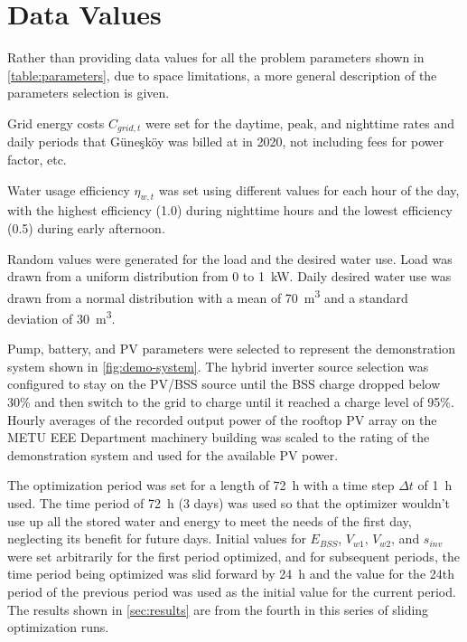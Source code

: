 \section{Data Values}

Rather than providing data values for all the problem parameters shown in \cref{table:parameters}, due to space limitations, a more general description of the parameters selection is given.

Grid energy costs $C_{grid,t}$ were set for the daytime, peak, and nighttime rates and daily periods that Güneşköy was billed at in 2020, not including fees for power factor, etc.

Water usage efficiency $\eta_{w,t}$ was set using different values for each hour of the day, with the highest efficiency (\num{1.0}) during nighttime hours and the lowest efficiency (\num{0.5}) during early afternoon.

Random values were generated for the load and the desired water use. Load was drawn from a uniform distribution from 0 to \SI{1}{kW}.
Daily desired water use was drawn from a normal distribution with a mean of \SI{70}{m^3} and a standard deviation of \SI{30}{m^3}.

Pump, battery, and PV parameters were selected to represent the demonstration system shown in \cref{fig:demo-system}.
The hybrid inverter source selection was configured to stay on the PV/BSS source until the BSS charge dropped below 30\% and then switch to the grid to charge until it reached a charge level of 95\%.
Hourly averages of the recorded output power of the rooftop PV array on the METU EEE Department machinery building was scaled to the rating of the demonstration system and used for the available PV power.

The optimization period was set for a length of \SI{72}{h} with a time step $\Delta t$ of \SI{1}{h} used. The time period of \SI{72}{h} (3 days) was used so that the optimizer wouldn't use up all the stored water and energy to meet the needs of the first day, neglecting its benefit for future days.
Initial values for $E_{BSS}$, $V_{w1}$, $V_{w2}$, and $s_{inv}$ were set arbitrarily for the first period optimized, and for subsequent periods, the time period being optimized was slid forward by \SI{24}{h} and the value for the 24th period of the previous period was used as the initial value for the current period.
The results shown in \cref{sec:results} are from the fourth in this series of sliding optimization runs.